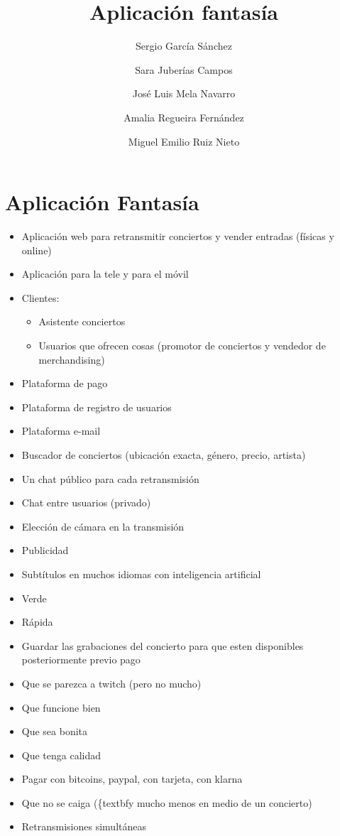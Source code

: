 \documentclass{report}
\begin{document}
    \title{Aplicación fantasía}
	\author{
		Sergio García Sánchez
		\and
		Sara Juberías Campos
		\and
		José Luis Mela Navarro
		\and
		Amalia Regueira Fernández
		\and
		Miguel Emilio Ruiz Nieto
	}

	\maketitle
	\section*{Aplicación Fantasía}
	\begin{itemize}
		\item Aplicación web para retransmitir conciertos y vender entradas (físicas y online)
		\item Aplicación para la tele y para el móvil
		\item Clientes:
		\begin{itemize}
			\item Asistente conciertos
			\item Usuarios que ofrecen cosas (promotor de conciertos y vendedor de merchandising)
		\end{itemize}
		\item Plataforma de pago
		\item Plataforma de registro de usuarios
		\item Plataforma e-mail
		\item Buscador de conciertos (ubicación exacta, género, precio, artista)
		\item Un chat público para cada retransmisión
		\item Chat entre usuarios (privado)
		\item Elección de cámara en la transmisión
		\item Publicidad
		\item Subtítulos en muchos idiomas con inteligencia artificial
		\item Verde
		\item Rápida
		\item Guardar las grabaciones del concierto para que esten disponibles posteriormente previo pago
		\item Que se parezca a twitch (pero no mucho)
		\item Que funcione bien
		\item Que sea bonita
		\item Que tenga calidad
		\item Pagar con bitcoins, paypal, con tarjeta, con klarna
		\item Que no se caiga (\{textbf{y mucho menos en medio de un concierto})
		\item Retransmisiones simultáneas
	\end{itemize}
\end{document}
